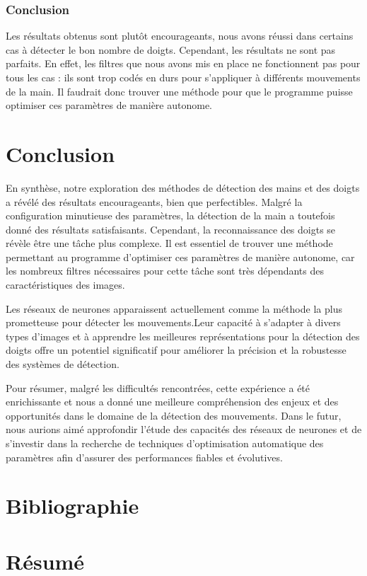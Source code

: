\documentclass[11pt]{article}
\begin{document}
\subsubsection{Conclusion}
Les résultats obtenus sont plutôt encourageants, nous avons réussi dans certains cas à détecter le bon nombre de doigts. Cependant, les résultats ne sont pas parfaits. En effet, les filtres que nous avons mis en place ne fonctionnent pas pour tous les cas : ils sont trop codés en durs pour s'appliquer à différents mouvements de la main. Il faudrait donc trouver une méthode pour que le programme puisse optimiser ces paramètres de manière autonome.

\section*{Conclusion}
En synthèse, notre exploration des méthodes de détection des mains et des doigts a révélé des résultats encourageants, bien que perfectibles. Malgré la configuration minutieuse des paramètres, la détection de la main a toutefois donné des résultats satisfaisants. Cependant, la reconnaissance des doigts se révèle être une tâche plus complexe. Il est essentiel de trouver une méthode permettant au programme d'optimiser ces paramètres de manière autonome, car les nombreux filtres nécessaires pour cette tâche sont très dépendants des caractéristiques des images. \bigbreak

Les réseaux de neurones apparaissent actuellement comme la méthode la plus prometteuse pour détecter les mouvements.Leur capacité à s'adapter à divers types d'images et à apprendre les meilleures représentations pour la détection des doigts offre un potentiel significatif pour améliorer la précision et la robustesse des systèmes de détection. \bigbreak

Pour résumer, malgré les difficultés rencontrées, cette expérience a été enrichissante et nous a donné une meilleure compréhension des enjeux et des opportunités dans le domaine de la détection des mouvements. Dans le futur, nous aurions aimé approfondir l'étude des capacités des réseaux de neurones et de s'investir dans la recherche de techniques d'optimisation automatique des paramètres afin d'assurer des performances fiables et évolutives. \bigbreak

\newpage

\section*{Bibliographie}
\printbibliography

\newpage




\newpage

\newpage
\section*{Résumé}
\end{document}
